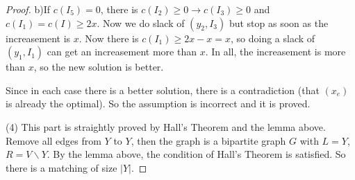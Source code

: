 \begin{proof}
    b)If $c(I_5)=0$, there is $c(I_2)\geq 0\rightarrow c(I_3)\geq 0$ and $c(I_1)=c(I)\geq 2x$. 
    Now we do slack of $(y_2,I_3)$ but stop as soon as the increasement is $x$. 
    Now there is $c(I_1)\geq 2x-x=x$, so doing a slack of $(y_1,I_1)$ can get an increasement more than $x$. 
    In all, the increasement is more than $x$, so the new solution is better. 

    Since in each case there is a better solution, there is a contradiction (that $(x_e)$ is already the optimal). 
    So the assumption is incorrect and it is proved. 
    
    \bigskip
    
    (4) This part is straightly proved by Hall's Theorem and the lemma above. Remove all edges from $Y$ to $Y$, 
    then the graph is a bipartite graph $G$ with $L = Y$, $R = V\backslash Y$. By the lemma above, the condition of Hall's Theorem is satisfied. 
    So there is a matching of size $|Y|$. 
    \end{proof}


